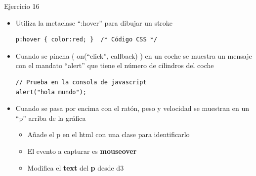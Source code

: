 \documentclass[ignorenonframetext,]{beamer}
\begin{document}
\begin{frame}[fragile]{Ejercicio 16}

\begin{itemize}
\item
  Utiliza la metaclase ``:hover'' para dibujar un stroke

\begin{lstlisting}
p:hover { color:red; }  /* Código CSS */
\end{lstlisting}
\item
  Cuando se pincha ( on(``click'', callback) ) en un coche se muestra un
  mensaje con el mandato ``alert'' que tiene el número de cilindros del
  coche

\begin{lstlisting}
// Prueba en la consola de javascript
alert("hola mundo");
\end{lstlisting}
\item
  Cuando se pasa por encima con el ratón, peso y velocidad se muestran
  en un ``p'' arriba de la gráfica

  \begin{itemize}
  \itemsep1pt\parskip0pt
  \item
    Añade el p en el html con una clase para identificarlo
  \item
    El evento a capturar es \textbf{mouseover}
  \item
    Modifica el \textbf{text} del \textbf{p} desde d3
  \end{itemize}
\end{itemize}

\end{frame}
\end{document}

